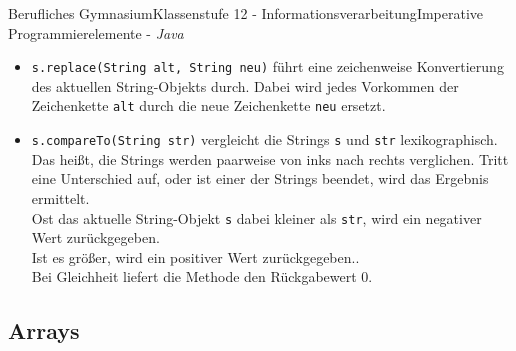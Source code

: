 \documentclass[oneside,openany,headings=optiontotoc,11pt,numbers=noenddot]{article}
\begin{document}
\begin{worksheet}{Berufliches Gymnasium}{Klassenstufe 12 - Informationsverarbeitung}{Imperative Programmierelemente - \textit{Java}}
\begin{itemize}
			\item \lstinline[style=JavaInputStyle]|s.replace(String alt, String neu)| führt eine zeichenweise Konvertierung des aktuellen String-Objekts durch. Dabei wird jedes Vorkommen der Zeichenkette \lstinline[style=JavaInputStyle]|alt| durch die neue Zeichenkette \lstinline[style=JavaInputStyle]|neu| ersetzt.
			\item \lstinline[style=JavaInputStyle]|s.compareTo(String str)| vergleicht die Strings \lstinline[style=JavaInputStyle]|s| und \lstinline[style=JavaInputStyle]|str| lexikographisch. Das heißt, die Strings werden paarweise von inks nach rechts verglichen. Tritt eine Unterschied auf, oder ist einer der Strings beendet, wird das Ergebnis ermittelt.\\
			Ost das aktuelle String-Objekt \lstinline[style=JavaInputStyle]|s| dabei kleiner als \lstinline[style=JavaInputStyle]|str|, wird ein negativer Wert zurückgegeben.\\
			Ist es größer, wird ein positiver Wert zurückgegeben..\\
			Bei Gleichheit liefert die Methode den Rückgabewert 0.
		\end{itemize}
		\subsection{Arrays}

\end{worksheet}
\end{document}
